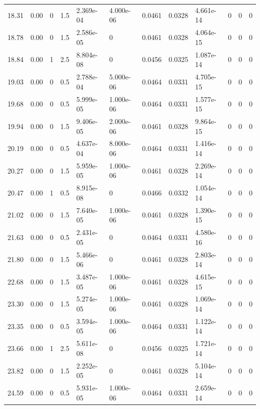 \documentclass[preview]{standalone}
\begin{document}
{{{\begin{tabular}{L{1.2cm}C{1.2cm} C{0.3cm}C{0.5cm} C{1.4cm}C{1.4cm} C{1.4cm}C{1.4cm} C{1.6cm}C{1.6cm} C{1.6cm}C{1.6cm}}
  18.31  &  0.00  & 0     & 1.5 &  2.369e-04  & 4.000e-06  &  0.0461&   0.0328& 4.661e-14 & 0   &  0 & 0  \\ 
  18.78  &  0.00  & 0     & 1.5 &  2.586e-05  & 0  &  0.0461&   0.0328& 4.064e-15 & 0   &  0 & 0  \\ 
  18.84  &  0.00  & 1     & 2.5 &  8.804e-08  & 0  &  0.0456&   0.0325& 1.087e-14 & 0   &  0 & 0  \\ 
  19.03  &  0.00  & 0     & 0.5 &  2.788e-04  & 5.000e-06  &  0.0464&   0.0331& 4.705e-15 & 0   &  0 & 0  \\ 
  19.68  &  0.00  & 0     & 0.5 &  5.999e-05  & 1.000e-06  &  0.0464&   0.0331& 1.577e-15 & 0   &  0 & 0  \\ 
  19.94  &  0.00  & 0     & 1.5 &  9.406e-05  & 2.000e-06  &  0.0461&   0.0328& 9.864e-15 & 0   &  0 & 0  \\ 
  20.19  &  0.00  & 0     & 0.5 &  4.637e-04  & 8.000e-06  &  0.0464&   0.0331& 1.416e-14 & 0   &  0 & 0  \\ 
  20.27  &  0.00  & 0     & 1.5 &  5.959e-05  & 1.000e-06  &  0.0461&   0.0328& 2.269e-14 & 0   &  0 & 0  \\ 
  20.47  &  0.00  & 1     & 0.5 &  8.915e-08  & 0  &  0.0466&   0.0332& 1.054e-14 & 0   &  0 & 0  \\ 
  21.02  &  0.00  & 0     & 1.5 &  7.640e-05  & 1.000e-06  &  0.0461&   0.0328& 1.390e-15 & 0   &  0 & 0  \\ 
  21.63  &  0.00  & 0     & 0.5 &  2.431e-05  & 0  &  0.0464&   0.0331& 4.580e-16 & 0   &  0 & 0  \\ 
  21.80  &  0.00  & 0     & 1.5 &  5.466e-06  & 0  &  0.0461&   0.0328& 2.803e-14 & 0   &  0 & 0  \\ 
  22.68  &  0.00  & 0     & 1.5 &  3.487e-05  & 1.000e-06  &  0.0461&   0.0328& 4.615e-15 & 0   &  0 & 0  \\ 
  23.30  &  0.00  & 0     & 1.5 &  5.274e-05  & 1.000e-06  &  0.0461&   0.0328& 1.069e-14 & 0   &  0 & 0  \\ 
  23.35  &  0.00  & 0     & 0.5 &  3.594e-05  & 1.000e-06  &  0.0464&   0.0331& 1.122e-14 & 0   &  0 & 0  \\ 
  23.66  &  0.00  & 1     & 2.5 &  5.611e-08  & 0  &  0.0456&   0.0325& 1.721e-14 & 0   &  0 & 0  \\ 
  23.82  &  0.00  & 0     & 1.5 &  2.252e-05  & 0  &  0.0461&   0.0328& 5.104e-14 & 0   &  0 & 0  \\ 
  24.59  &  0.00  & 0     & 0.5 &  5.931e-05  & 1.000e-06  &  0.0464&   0.0331& 2.659e-14 & 0   &  0 & 0  \\ 

\end{tabular}}}}
\end{document}
